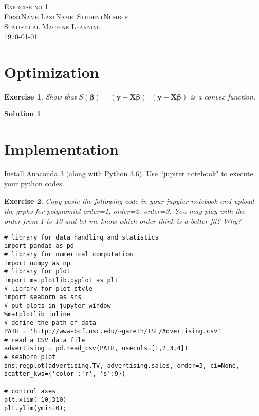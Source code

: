 \documentclass[12pt,a4paper]{article}
\def\StudentName{FirstName LastName}
\def\StudentMatricule{StudentNumber}
\def\ExerciseNo{1}
\def \y {\mathbf y}
\def \X {\mathbf X}
\def \t {^\top}
\def \bbeta {\boldsymbol \beta}
\newtheorem{exercise}{Exercise}
\numberwithin{exercise}{section} %
\newtheorem{solution}{Solution}
\numberwithin{solution}{section} %
\begin{document}
\begin{titlepage}
\begin{center}
\textsc{\LARGE Exercise no \ExerciseNo}\\[1.5cm]
\vspace{2in}
\textsc{\Large \StudentName~\StudentMatricule}\\[0.5cm]
\textsc{Statistical Machine Learning}\\[0.5cm]
\today
\end{center}
\end{titlepage}



\section{Optimization}
\begin{exercise}
Show that  $S(\bbeta) = (\y-\X\bbeta)\t  (\y-\X\bbeta)$ is a convex function.
\end{exercise}
\begin{solution}
\end{solution}


\section{Implementation} Install Anaconda 3 (along with Python 3.6). Use ``jupiter notebook" to execute your python codes.
\begin{exercise} Copy paste the following code in your jupyter notebook and upload the grphs for polynomial order=1, order=2, order=3. You may play with the order from 1 to 10 and let me know which order think is a better fit? Why?
\newpage
\begin{verbatim}
# library for data handling and statistics 
import pandas as pd
# library for numerical computation
import numpy as np
# library for plot
import matplotlib.pyplot as plt
# library for plot style
import seaborn as sns
# put plots in jupyter window
%matplotlib inline
# define the path of data
PATH = 'http://www-bcf.usc.edu/~gareth/ISL/Advertising.csv'
# read a CSV data file
advertising = pd.read_csv(PATH, usecols=[1,2,3,4])
# seaborn plot
sns.regplot(advertising.TV, advertising.sales, order=3, ci=None, scatter_kws={'color':'r', 's':9})

# control axes 
plt.xlim(-10,310)
plt.ylim(ymin=0);
\end{verbatim} 
\end{exercise}
\end{document}
